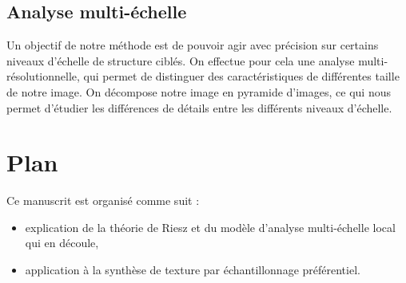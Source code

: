\subsection*{Analyse multi-échelle}

Un objectif de notre méthode est de pouvoir agir avec précision sur certains niveaux d'échelle de structure ciblés. On effectue pour cela une analyse multi-résolutionnelle, qui permet de distinguer des caractéristiques de différentes taille de notre image. On décompose notre image en pyramide d'images, ce qui nous permet d'étudier les différences de détails entre les différents niveaux d'échelle.

\section{Plan} %

Ce manuscrit est organisé comme suit :

\begin{itemize}
    \item explication de la théorie de Riesz et du modèle d'analyse multi-échelle local qui en découle,
    \item application à la synthèse de texture par échantillonnage préférentiel.
\end{itemize}